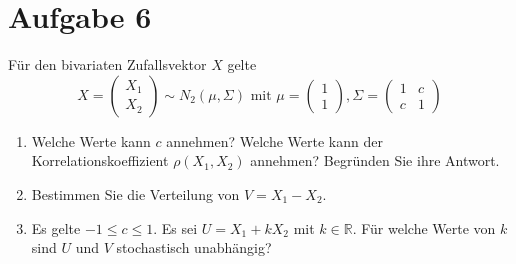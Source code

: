 \section*{Aufgabe 6}
Für den bivariaten Zufallsvektor $X$ gelte
\[X = \begin{pmatrix}X_1\\X_2\end{pmatrix} \sim N_2(\mu, \Sigma) \text{ mit } \mu=\begin{pmatrix}1\\1\end{pmatrix}, \Sigma = \begin{pmatrix}1 & c\\c & 1\end{pmatrix}\]

\begin{enumerate}[label=(\alph*)]
    \item Welche Werte kann $c$ annehmen? Welche Werte kann der Korrelationskoeffizient $\rho(X_1, X_2)$ annehmen? Begründen Sie ihre Antwort.
    \item Bestimmen Sie die Verteilung von $V = X_1 - X_2$.
    \item Es gelte $-1 \leq c \leq 1$. Es sei $U = X_1 + k X_2$ mit $k \in \mathbb{R}$. Für welche
          Werte von $k$ sind $U$ und $V$ stochastisch unabhängig?
\end{enumerate}
